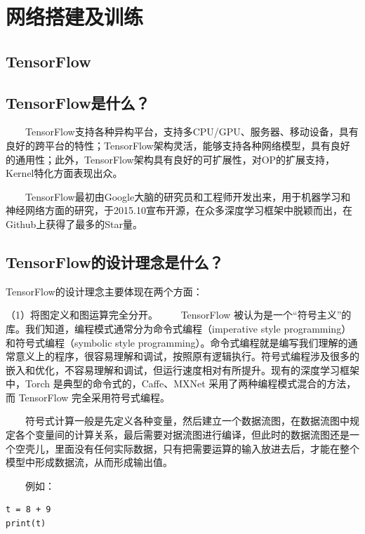 \chapter{网络搭建及训练}\label{ux7b2cux5341ux4e8cux7ae0-ux7f51ux7edcux642dux5efaux53caux8badux7ec3}

\section{ TensorFlow}\label{tensorflow}

\section{TensorFlow是什么？}\label{tensorflowux662fux4ec0ux4e48}

  TensorFlow支持各种异构平台，支持多CPU/GPU、服务器、移动设备，具有良好的跨平台的特性；TensorFlow架构灵活，能够支持各种网络模型，具有良好的通用性；此外，TensorFlow架构具有良好的可扩展性，对OP的扩展支持，Kernel特化方面表现出众。

  TensorFlow最初由Google大脑的研究员和工程师开发出来，用于机器学习和神经网络方面的研究，于2015.10宣布开源，在众多深度学习框架中脱颖而出，在Github上获得了最多的Star量。

\section{TensorFlow的设计理念是什么？}\label{tensorflowux7684ux8bbeux8ba1ux7406ux5ff5ux662fux4ec0ux4e48}

TensorFlow的设计理念主要体现在两个方面：

（1）将图定义和图运算完全分开。   TensorFlow
被认为是一个``符号主义''的库。我们知道，编程模式通常分为命令式编程（imperative
style programming）和符号式编程（symbolic style
programming）。命令式编程就是编写我们理解的通常意义上的程序，很容易理解和调试，按照原有逻辑执行。符号式编程涉及很多的嵌入和优化，不容易理解和调试，但运行速度相对有所提升。现有的深度学习框架中，Torch
是典型的命令式的，Caffe、MXNet 采用了两种编程模式混合的方法，而
TensorFlow 完全采用符号式编程。

  符号式计算一般是先定义各种变量，然后建立一个数据流图，在数据流图中规定各个变量间的计算关系，最后需要对据流图进行编译，但此时的数据流图还是一个空壳儿，里面没有任何实际数据，只有把需要运算的输入放进去后，才能在整个模型中形成数据流，从而形成输出值。

　　例如：

\begin{verbatim}
t = 8 + 9
print(t)
\end{verbatim}

